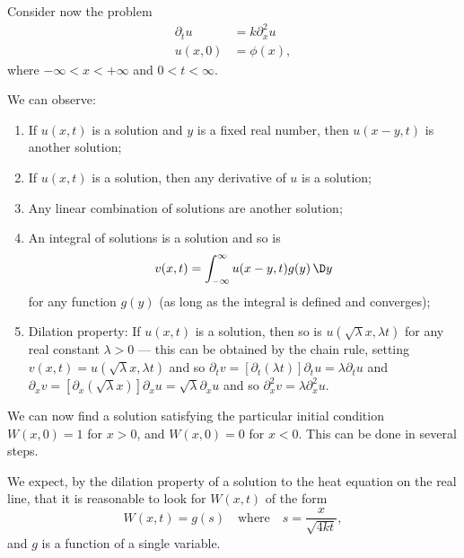 \begin{node}\label{pde:heat-0007}%
Consider now the problem
\begin{subequations}\label{eq:pde:heat:diffusion-on-real-line}
\begin{align}
\partial_{t}u &= k\partial_{x}^{2}u\\
u(x,0) &= \phi(x),
\end{align}
\end{subequations}
where $-\infty<x<+\infty$ and $0<t<\infty$.

\begin{node}\label{pde:heat-0008}%
We can observe:
\begin{enumerate}
\item If $u(x,t)$ is a solution and $y$ is a fixed real number, then
  $u(x-y,t)$ is another solution;
\item If $u(x,t)$ is a solution, then any derivative of $u$ is a solution;
\item Any linear combination of solutions are another solution;
\item An integral of solutions is a solution and so is
\begin{equation*}
v(x,t)=\int^{\infty}_{-\infty}u(x-y,t)g(y)\,\D y
\end{equation*}
for any function $g(y)$ (as long as the integral is defined and converges);
\item Dilation property: If $u(x,t)$ is a solution, then so is $u(\sqrt{\lambda}x,\lambda t)$
  for any real constant $\lambda>0$ --- this can be obtained by the
  chain rule, setting $v(x,t)=u(\sqrt{\lambda}x,\lambda t)$ and so
  $\partial_{t}v=[\partial_{t}(\lambda t)]\partial_{t}u=\lambda\partial_{t}u$
  and
  $\partial_{x}v=[\partial_{x}(\sqrt{\lambda}x)]\partial_{x}u=\sqrt{\lambda}\partial_{x}u$
  and so $\partial_{x}^{2}v=\lambda\partial_{x}^{2}u$.
\end{enumerate}
\end{node} %

\begin{node}[Solution]\label{pde:heat-0009}%
We can now find a solution satisfying the particular initial condition
$W(x,0)=1$ for $x>0$, and $W(x,0)=0$ for $x<0$. This can be done in
several steps.

\begin{node}[Step 1]\label{pde:heat-000A}%
We expect, by the dilation property of a solution to the heat equation
on the real line, that it is reasonable to look for $W(x,t)$ of the form
\begin{equation}
W(x,t) = g(s)\quad\mbox{where}\quad s=\frac{x}{\sqrt{4kt}},
\end{equation}
and $g$ is a function of a single variable.


\end{node}
\end{node}
\end{node}
